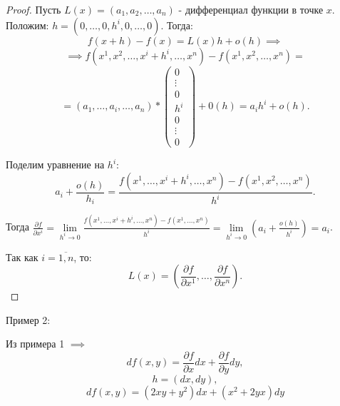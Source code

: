 \documentclass{report}
\theoremstyle{definition}
\begin{document}
\begin{proof}
  Пусть $L(x) = (a_1,a_2,\ldots,a_n)$ - дифференциал функции в точке $x$. Положим: $h = (0,\ldots,0,h^i,0,\ldots,0)$.
  Тогда:
  \begin{equation*}
    f(x+h) - f(x) = L(x)h + o(h) \implies  
  \end{equation*}
  \begin{equation*}
    \implies f(x^1,x^2,\ldots,x^i + h^i,\ldots,x^n) - f(x^1,x^2,\ldots,x^n) =
  \end{equation*}
  \begin{equation*}
    = (a_1,\ldots, a_i, \ldots,a_n) * \left(\begin{array}{c}
      0 \\
      \vdots \\
      0 \\
      h^i \\
      0 \\
      \vdots \\
      0
    \end{array}\right) + 0(h) = a_ih^i + o(h).
  \end{equation*}

  Поделим уравнение на $h^i$:
  \begin{equation*}
    a_i + \frac{o(h)}{h_i} = \frac{f(x^1,\ldots,x^i + h^i,\ldots, x^n) - f(x^1,x^2,\ldots,x^n)}{h^i}.
  \end{equation*}

  Тогда $\frac{\partial f}{\partial x^i} = \underset{h^i\rightarrow 0}{\lim} \frac{f(x^1,\ldots,x^i + h^i,
  \ldots,x^n) - f(x^1,\ldots,x^n)}{h^i} = \underset{h^i\rightarrow 0}{\lim} (a_i + \frac{o(h)}{h^i}) = a_i$.

  Так как $i = \overline{1,n}$, то:
  \begin{equation*}
    L(x) = (\frac{\partial f}{\partial x^1}, \ldots, \frac{\partial f}{\partial x^n}).
  \end{equation*}
\end{proof}

Пример 2:

Из примера 1 $\implies$
\begin{equation*}
  df(x,y) = \frac{\partial f}{\partial x}dx + \frac{\partial f}{\partial y}dy,
\end{equation*}
\begin{equation*}
  h = (dx,dy),
\end{equation*}
\begin{equation*}
  df(x,y) = (2xy + y^2)dx + (x^2 + 2yx)dy
\end{equation*}
\end{document}
